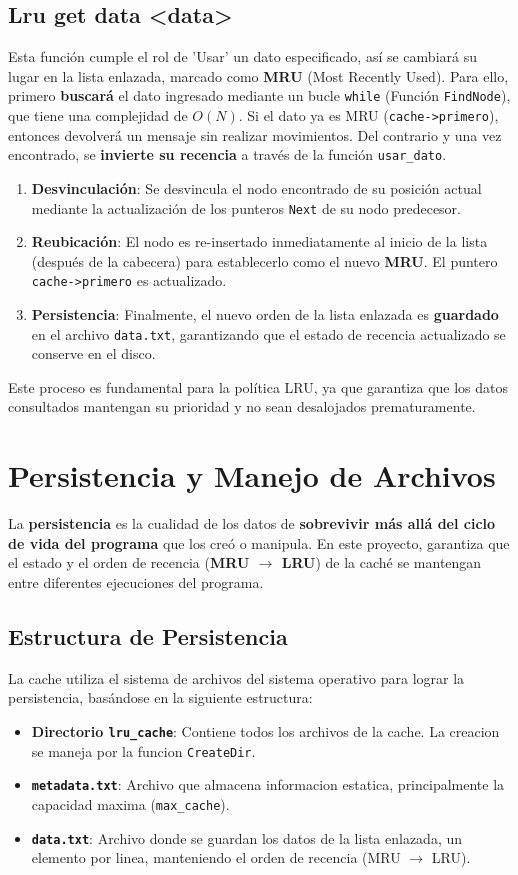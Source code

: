     \subsection{Lru get data \textless data\textgreater}
    Esta función cumple el rol de 'Usar' un dato especificado, así se cambiará su lugar en la lista enlazada, marcado como \textbf{MRU} (Most Recently Used). 
    Para ello, primero \textbf{buscará} el dato ingresado mediante un bucle \texttt{while} (Función \texttt{FindNode}), que tiene una complejidad de $O(N)$. 
    Si el dato ya es MRU (\texttt{cache->primero}), entonces devolverá un mensaje sin realizar movimientos. Del contrario y una vez encontrado,
    se \textbf{invierte su recencia} a través de la función \texttt{usar\_dato}.
    \begin{enumerate}
        \item \textbf{Desvinculación}: Se desvincula el nodo encontrado de su posición actual mediante la actualización de los punteros \texttt{Next} de su nodo predecesor.
        \item \textbf{Reubicación}: El nodo es re-insertado inmediatamente al inicio de la lista (después de la cabecera) para establecerlo como el nuevo \textbf{MRU}. El puntero \texttt{cache->primero} es actualizado.
        \item \textbf{Persistencia}: Finalmente, el nuevo orden de la lista enlazada es \textbf{guardado} en el archivo \texttt{data.txt}, garantizando que el estado de recencia actualizado se conserve en el disco.
    \end{enumerate}
    Este proceso es fundamental para la política LRU, ya que garantiza que los datos consultados mantengan su prioridad y no sean desalojados prematuramente.
\section{Persistencia y Manejo de Archivos}
    La \textbf{persistencia} es la cualidad de los datos de \textbf{sobrevivir más allá del ciclo de vida del programa} que los creó o manipula. En este proyecto, 
    garantiza que el estado y el orden de recencia (\textbf{MRU $\rightarrow$ LRU}) de la caché se mantengan entre diferentes ejecuciones del programa.
    \subsection{Estructura de Persistencia}
    La cache utiliza el sistema de archivos del sistema operativo para lograr la persistencia, basándose en la siguiente estructura:
    \begin{itemize}
        \item \textbf{Directorio \texttt{lru\_cache}}: Contiene todos los archivos de la cache. La creacion se maneja por la funcion \texttt{CreateDir}.
        \item \textbf{\texttt{metadata.txt}}: Archivo que almacena informacion estatica, principalmente la capacidad maxima (\texttt{max\_cache}).
        \item \textbf{\texttt{data.txt}}: Archivo donde se guardan los datos de la lista enlazada, un elemento por linea, manteniendo el orden de recencia (MRU $\rightarrow$ LRU).
    \end{itemize}

